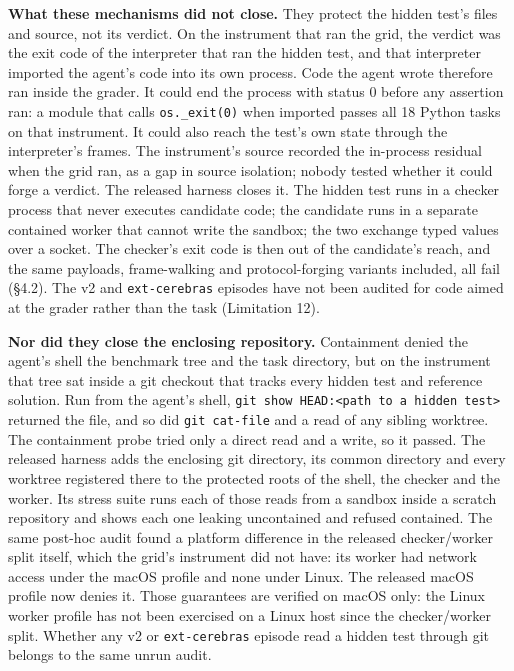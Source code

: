\documentclass[
  10pt,
  a4paper,
]{article}
\newcounter{none} %
\let\oldtexttt\texttt
\renewcommand{\texttt}[1]{{\small\oldtexttt{#1}}}
\begin{document}
\textbf{What these mechanisms did not close.} They protect the hidden
test's files and source, not its verdict. On the instrument that ran the
grid, the verdict was the exit code of the interpreter that ran the
hidden test, and that interpreter imported the agent's code into its own
process. Code the agent wrote therefore ran inside the grader. It could
end the process with status 0 before any assertion ran: a module that
calls \texttt{os.\_exit(0)} when imported passes all 18 Python tasks on
that instrument. It could also reach the test's own state through the
interpreter's frames. The instrument's source recorded the in-process
residual when the grid ran, as a gap in source isolation; nobody tested
whether it could forge a verdict. The released harness closes it. The
hidden test runs in a checker process that never executes candidate
code; the candidate runs in a separate contained worker that cannot
write the sandbox; the two exchange typed values over a socket. The
checker's exit code is then out of the candidate's reach, and the same
payloads, frame-walking and protocol-forging variants included, all fail
(§4.2). The v2 and \texttt{ext-cerebras} episodes have not been audited
for code aimed at the grader rather than the task (Limitation 12).

\textbf{Nor did they close the enclosing repository.} Containment denied
the agent's shell the benchmark tree and the task directory, but on the
instrument that tree sat inside a git checkout that tracks every hidden
test and reference solution. Run from the agent's shell,
\texttt{git\ show\ HEAD:\textless{}path\ to\ a\ hidden\ test\textgreater{}}
returned the file, and so did \texttt{git\ cat-file} and a read of any
sibling worktree. The containment probe tried only a direct read and a
write, so it passed. The released harness adds the enclosing git
directory, its common directory and every worktree registered there to
the protected roots of the shell, the checker and the worker. Its stress
suite runs each of those reads from a sandbox inside a scratch
repository and shows each one leaking uncontained and refused contained.
The same post-hoc audit found a platform difference in the released
checker/worker split itself, which the grid's instrument did not have:
its worker had network access under the macOS profile and none under
Linux. The released macOS profile now denies it. Those guarantees are
verified on macOS only: the Linux worker profile has not been exercised
on a Linux host since the checker/worker split. Whether any v2 or
\texttt{ext-cerebras} episode read a hidden test through git belongs to
the same unrun audit.
\end{document}

